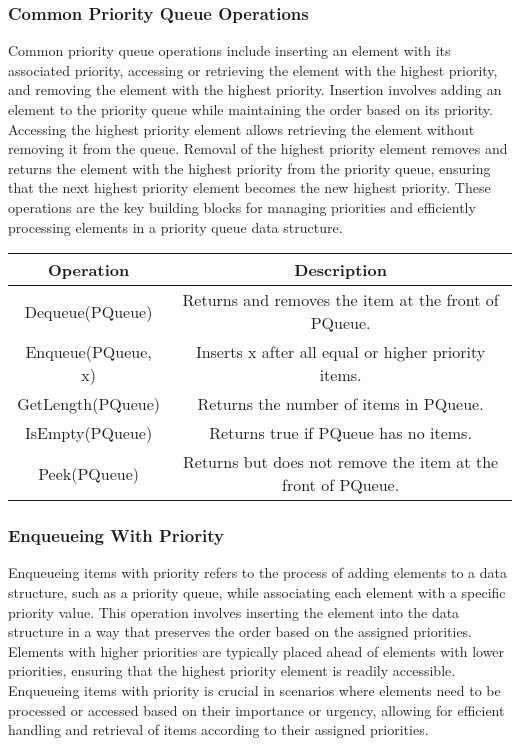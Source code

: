 \subsubsection{Common Priority Queue Operations}

Common priority queue operations include inserting an element with its associated priority, accessing or retrieving the element with the highest priority, and removing the element with the highest priority. 
Insertion involves adding an element to the priority queue while maintaining the order based on its priority. Accessing the highest priority element allows retrieving the element without removing it from the 
queue. Removal of the highest priority element removes and returns the element with the highest priority from the priority queue, ensuring that the next highest priority element becomes the new highest priority. 
These operations are the key building blocks for managing priorities and efficiently processing elements in a priority queue data structure.

\begin{center}
    \begin{tabular}[ht]{|c|c|}
        \hline \textbf{Operation} & \textbf{Description} \\ \hline
        Dequeue(PQueue) & Returns and removes the item at the front of PQueue. \\ \hline
        Enqueue(PQueue, x) & Inserts x after all equal or higher priority items. \\ \hline
        GetLength(PQueue) & Returns the number of items in PQueue. \\ \hline
        IsEmpty(PQueue) & Returns true if PQueue has no items. \\ \hline
        Peek(PQueue) & Returns but does not remove the item at the front of PQueue. \\ \hline
    \end{tabular}
\end{center}

\subsubsection{Enqueueing With Priority}

Enqueueing items with priority refers to the process of adding elements to a data structure, such as a priority queue, while associating each element with a specific priority value. This operation involves 
inserting the element into the data structure in a way that preserves the order based on the assigned priorities. Elements with higher priorities are typically placed ahead of elements with lower priorities, 
ensuring that the highest priority element is readily accessible. Enqueueing items with priority is crucial in scenarios where elements need to be processed or accessed based on their importance or urgency, 
allowing for efficient handling and retrieval of items according to their assigned priorities.

